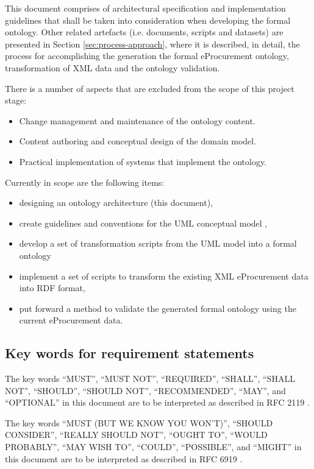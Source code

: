 	This document comprises of architectural specification and implementation guidelines that shall be taken into consideration when developing the formal ontology. Other related artefacts (i.e. documents, scripts and datasets) are presented in Section \ref{sec:process-approach}, where it is described, in detail, the process for accomplishing the generation the formal eProcurement ontology, transformation of XML data and the ontology validation.
	
	There is a number of aspects that are excluded from the scope of this project stage:	
	\begin{itemize}
		\item Change management and maintenance of the ontology content.
		\item Content authoring and conceptual design of the domain model.
		\item Practical implementation of systems that implement the ontology.
	\end{itemize}
	
	Currently in scope are the following items:
	\begin{itemize}
		\item designing an ontology architecture (this document),
		\item create guidelines and conventions for the UML conceptual model \citep{costetchi2020b}, 
		\item develop a set of transformation scripts from the UML model into a formal ontology
		\item implement a set of scripts to transform the existing XML eProcurement data into RDF format,
		\item put forward a method to validate the generated formal ontology using the current eProcurement data.
	\end{itemize}

	\subsection{Key words for requirement statements}
	\label{sec:keywords}
	The key words ``MUST'', ``MUST NOT'', ``REQUIRED'', ``SHALL'', ``SHALL  NOT'', ``SHOULD'', ``SHOULD NOT'', ``RECOMMENDED'',  ``MAY'', and ``OPTIONAL'' in this document are to be interpreted as described in RFC 2119 \cite{rfc2119}.

	The key words ``MUST (BUT WE KNOW YOU WON'T)'', ``SHOULD CONSIDER'', ``REALLY SHOULD NOT'', ``OUGHT TO'', ``WOULD PROBABLY'', ``MAY WISH TO'', ``COULD'', ``POSSIBLE'', and ``MIGHT'' in this document are to be interpreted as described in RFC 6919 \cite{rfc6919}.
	
